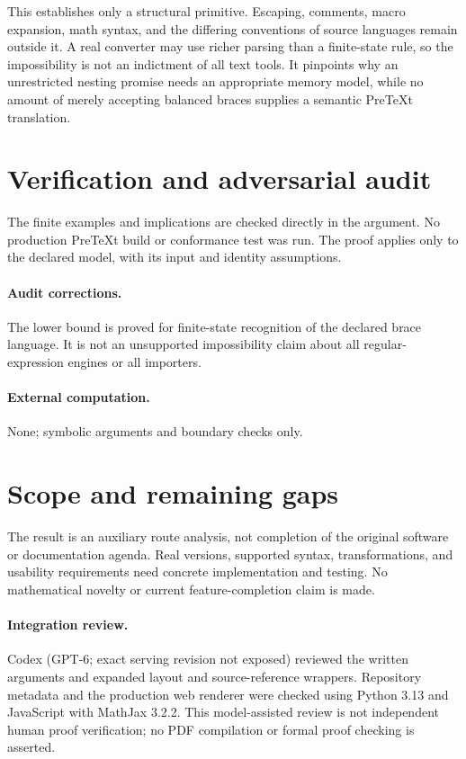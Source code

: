 \documentclass[11pt]{article}
\begin{document}
This establishes only a structural primitive. Escaping, comments, macro expansion, math syntax, and the differing conventions of source languages remain outside it. A real converter may use richer parsing than a finite-state rule, so the impossibility is not an indictment of all text tools. It pinpoints why an unrestricted nesting promise needs an appropriate memory model, while no amount of merely accepting balanced braces supplies a semantic PreTeXt translation.
\section{Verification and adversarial audit}
The finite examples and implications are checked directly in the argument. No production PreTeXt build or conformance test was run. The proof applies only to the declared model, with its input and identity assumptions.
\paragraph{Audit corrections.} The lower bound is proved for finite-state recognition of the declared brace language. It is not an unsupported impossibility claim about all regular-expression engines or all importers.
\paragraph{External computation.} None; symbolic arguments and boundary checks only.
\section{Scope and remaining gaps}
The result is an auxiliary route analysis, not completion of the original software or documentation agenda. Real versions, supported syntax, transformations, and usability requirements need concrete implementation and testing. No mathematical novelty or current feature-completion claim is made.
\paragraph{Integration review.} Codex (GPT-6; exact serving revision not exposed) reviewed the written arguments and expanded layout and source-reference wrappers. Repository metadata and the production web renderer were checked using Python 3.13 and JavaScript with MathJax 3.2.2. This model-assisted review is not independent human proof verification; no PDF compilation or formal proof checking is asserted.
\end{document}
